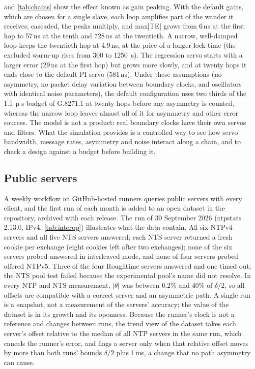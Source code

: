 \documentclass[11pt,a4paper]{article}
\newcommand{\micro}{\ensuremath{\upmu}}
\newcommand{\us}{\,\micro s}
\newcommand{\ns}{\,ns}
\newcommand{\ms}{\,ms}
\begin{document}
 and \cref{tab:chains} show the effect known as gain peaking. With the default gains,
which are chosen for a single slave, each loop amplifies part of the wander it receives; cascaded, the
peaks multiply, and max|TE| grows from 6\ns{} at the first hop to 57\ns{} at the tenth and 728\ns{} at
the twentieth. A narrow, well-damped loop keeps the twentieth hop at 4.9\ns, at the price of a longer
lock time (the excluded warm-up rises from 300 to 1250~s). The regression servo starts with a larger
error (29\ns{} at the first hop) but grows more slowly, and at twenty hops it ends close to the default
PI servo (581\ns).
Under these assumptions (no asymmetry, no packet delay variation between boundary clocks, and
oscillators with identical noise parameters), the default configuration uses two thirds of the
1.1\us{} budget of G.8271.1 at twenty hops before any asymmetry is counted, whereas the narrow loop
leaves almost all of it for asymmetry and other error sources. The
model is not a product: real boundary clocks have their own servos and filters. What the simulation
provides is a controlled way to see how servo bandwidth, message rates, asymmetry and noise interact
along a chain, and to check a design against a budget before building it.

\subsection{Public servers}\label{sec:interop}

A weekly workflow on GitHub-hosted runners queries public servers with every client, and the first
run of each month is added to an open dataset in the repository, archived with each release. The run
of 30 September 2026 (ntpstats 2.13.0, IPv4, \cref{tab:interop}) illustrates what the data contain. All
six NTPv4 servers and all five NTS servers answered; each NTS server returned a fresh cookie per
exchange (eight cookies left after two exchanges); none of the six servers probed answered in
interleaved mode, and none of four servers probed offered NTPv5. Three of the four Roughtime servers
answered and one timed out; the NTS pool test failed because the experimental pool's name did not
resolve. In every NTP and NTS measurement, $|\theta|$ was between 0.2\% and 40\% of $\delta/2$, so all
offsets are compatible with a correct server and an asymmetric path. A single run is a snapshot, not a
measurement of the servers' accuracy; the value of the dataset is in its growth and its openness.
Because the runner's clock is not a reference and changes between runs, the trend view of the dataset
takes each server's offset relative to the median of all NTP servers in the same run, which cancels the
runner's error, and flags a server only when that relative offset moves by more than both runs' bounds
$\delta/2$ plus 1\ms, a change that no path asymmetry can cause.
\end{document}
